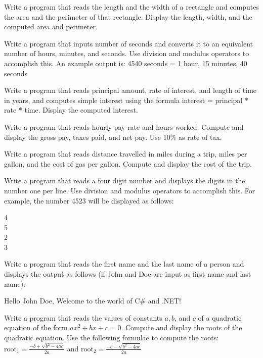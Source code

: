{\begin{list}{P \thechapter.\theenumi}
\item Write a program that reads the length and the width of a
rectangle and computes the area and the perimeter of that
rectangle. Display the length, width, and the computed area and
perimeter.

\item Write a program that inputs number of seconds and converts
it to an equivalent number of hours, minutes, and seconds. Use
division and modulus operators to accomplish this. An example
output is: 4540 seconds  =  1 hour,  15 minutes,  40 seconds

\item Write a program that reads principal amount, rate of
interest, and length of time in years, and computes simple
interest using the formula interest = principal $\ast$ rate $\ast$
time. Display the computed interest.

\item Write a program that reads hourly pay rate and hours worked.
Compute and display the gross pay, taxes paid, and net pay. Use
10\% as rate of tax.

\item Write a program that reads distance travelled in miles
during a trip, miles per gallon, and the cost of gas per gallon.
Compute and display the cost of the trip.

\item Write a program that reads a four digit number and displays
the digits in the number one per line. Use division and modulus
operators to accomplish this. For example, the number 4523 will be
displayed as follows:

4\\ 5\\ 2\\ 3

\item Write a program that reads the first name and the last name
of a person and displays the output as follows (if John and Doe
are input as first name and last name):

Hello John Doe, Welcome to the world of C\# and .NET!

\item Write a program that reads the values of constants $a, b$,
and $c$ of a quadratic equation of the form $ax^2 + bx + c = 0$.
Compute and display the roots of the quadratic equation. Use the
following formulae to compute the roots: $\mbox{root}_1 = \frac{-b
+ \sqrt{b^2 - 4ac}}{2a}$  and $\mbox{root}_2 = \frac{-b -
\sqrt{b^2 - 4ac}}{2a}$


\end{list}}
